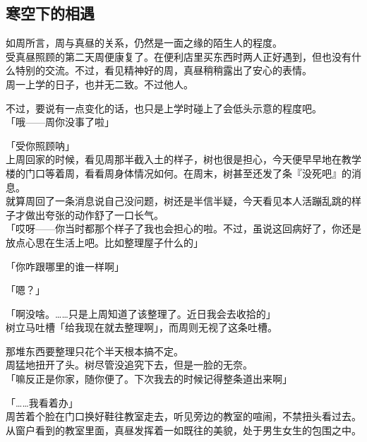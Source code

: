 \subsection{寒空下的相遇}

如周所言，周与真昼的关系，仍然是一面之缘的陌生人的程度。\\

受真昼照顾的第二天周便康复了。在便利店里买东西时两人正好遇到，但也没有什么特别的交流。不过，看见精神好的周，真昼稍稍露出了安心的表情。\\

周一上学的日子，也并无二致。不过他人。

不过，要说有一点变化的话，也只是上学时碰上了会低头示意的程度吧。\\

「哦——周你没事了啦」

「受你照顾呐」\\

上周回家的时候，看见周那半截入土的样子，树也很是担心，今天便早早地在教学楼的门口等着周，看看周身体情况如何。在周末，树甚至还发了条『没死吧』的消息。\\

就算周回了一条消息说自己没问题，树还是半信半疑，今天看见本人活蹦乱跳的样子才做出夸张的动作舒了一口长气。\\

「哎呀——你当时都那个样子了我也会担心的啦。不过，虽说这回病好了，你还是放点心思在生活上吧。比如整理屋子什么的」

「你咋跟哪里的谁一样啊」

「嗯？」

「啊没啥。……只是上周知道了该整理了。近日我会去收拾的」\\

树立马吐槽「给我现在就去整理啊」，而周则无视了这条吐槽。

那堆东西要整理只花个半天根本搞不定。\\

周猛地扭开了头。树尽管没追究下去，但是一脸的无奈。\\

「嘛反正是你家，随你便了。下次我去的时候记得整条道出来啊」

「……我看着办」\\

周苦着个脸在门口换好鞋往教室走去，听见旁边的教室的喧闹，不禁扭头看过去。\\

从窗户看到的教室里面，真昼发挥着一如既往的美貌，处于男生女生的包围之中。

